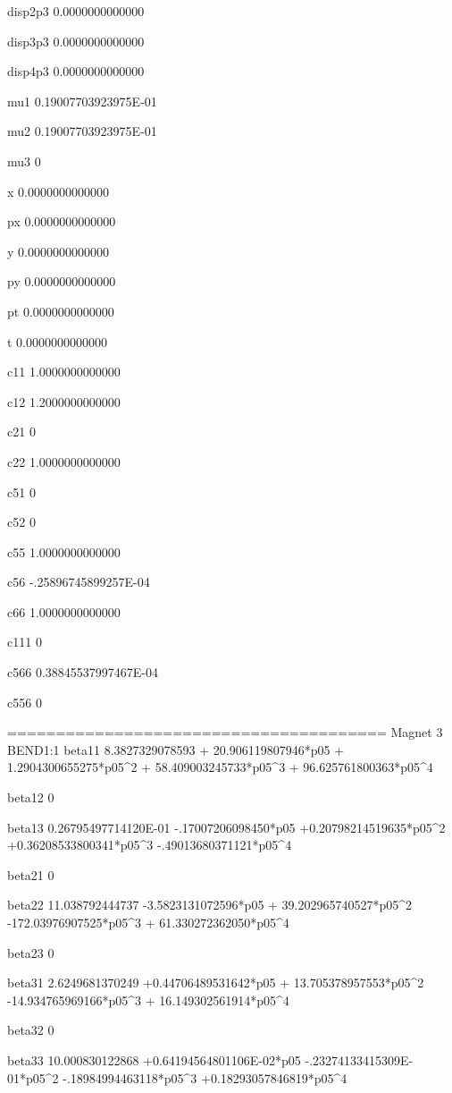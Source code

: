  disp2p3
   0.0000000000000 
  
 disp3p3
   0.0000000000000 
  
 disp4p3
   0.0000000000000 
  
 mu1    
  0.19007703923975E-01 
  
 mu2    
  0.19007703923975E-01 
  
 mu3    
 0 
  
 x      
   0.0000000000000 
  
 px     
   0.0000000000000 
  
 y      
   0.0000000000000 
  
 py     
   0.0000000000000 
  
 pt     
   0.0000000000000 
  
 t      
   0.0000000000000 
  
 c11
   1.0000000000000 
  
 c12
   1.2000000000000 
  
 c21
 0 
  
 c22
   1.0000000000000 
  
 c51
 0 
  
 c52
 0 
  
 c55
   1.0000000000000 
  
 c56
  -.25896745899257E-04 
  
 c66
   1.0000000000000 
  
 c111
 0 
  
 c566
  0.38845537997467E-04 
  
 c556
 0 
  
 =======================================
 Magnet  3  BEND1:1         
 beta11 
   8.3827329078593 + 20.906119807946*p05 + 1.2904300655275*p05^2 + 58.409003245733*p05^3 + 96.625761800363*p05^4 
  
 beta12 
 0 
  
 beta13 
  0.26795497714120E-01  -.17007206098450*p05 +0.20798214519635*p05^2 +0.36208533800341*p05^3  -.49013680371121*p05^4 
  
 beta21 
 0 
  
 beta22 
   11.038792444737  -3.5823131072596*p05 + 39.202965740527*p05^2  -172.03976907525*p05^3 + 61.330272362050*p05^4 
  
 beta23 
 0 
  
 beta31 
   2.6249681370249 +0.44706489531642*p05 + 13.705378957553*p05^2  -14.934765969166*p05^3 + 16.149302561914*p05^4 
  
 beta32 
 0 
  
 beta33 
   10.000830122868 +0.64194564801106E-02*p05  -.23274133415309E-01*p05^2  -.18984994463118*p05^3 +0.18293057846819*p05^4 
  
